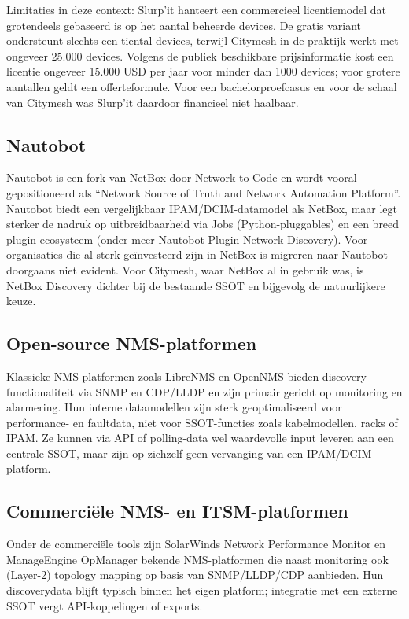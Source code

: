 Limitaties in deze context: Slurp'it hanteert een commercieel licentiemodel dat grotendeels gebaseerd is op het aantal beheerde devices. De gratis variant ondersteunt slechts een tiental devices, terwijl Citymesh in de praktijk werkt met ongeveer 25.000 devices. Volgens de publiek beschikbare prijsinformatie kost een licentie ongeveer 15.000 USD per jaar voor minder dan 1000 devices; voor grotere aantallen geldt een offerteformule. Voor een bachelorproefcasus en voor de schaal van Citymesh was Slurp'it daardoor financieel niet haalbaar.

\subsection{Nautobot}

Nautobot is een fork van NetBox door Network to Code en wordt vooral gepositioneerd als ``Network Source of Truth and Network Automation Platform''\autocite{Nautobot}. Nautobot biedt een vergelijkbaar IPAM/DCIM-datamodel als NetBox, maar legt sterker de nadruk op uitbreidbaarheid via Jobs (Python-pluggables) en een breed plugin-ecosysteem (onder meer Nautobot Plugin Network Discovery). Voor organisaties die al sterk ge\"investeerd zijn in NetBox is migreren naar Nautobot doorgaans niet evident. Voor Citymesh, waar NetBox al in gebruik was, is NetBox Discovery dichter bij de bestaande SSOT en bijgevolg de natuurlijkere keuze.

\subsection{Open-source NMS-platformen}

Klassieke NMS-platformen zoals LibreNMS\autocite{LibreNMS} en OpenNMS\autocite{OpenNMS} bieden discovery-functionaliteit via SNMP en CDP/LLDP en zijn primair gericht op monitoring en alarmering. Hun interne datamodellen zijn sterk geoptimaliseerd voor performance- en faultdata, niet voor SSOT-functies zoals kabelmodellen, racks of IPAM. Ze kunnen via API of polling-data wel waardevolle input leveren aan een centrale SSOT, maar zijn op zichzelf geen vervanging van een IPAM/DCIM-platform.

\subsection{Commerciële NMS- en ITSM-platformen}

Onder de commerci\"ele tools zijn SolarWinds Network Performance Monitor \autocite{SolarWindsNPM} en ManageEngine OpManager \autocite{ManageEngineOpManager} bekende NMS-platformen die naast monitoring ook (Layer-2) topology mapping op basis van SNMP/LLDP/CDP aanbieden. Hun discoverydata blijft typisch binnen het eigen platform; integratie met een externe SSOT vergt API-koppelingen of exports.

